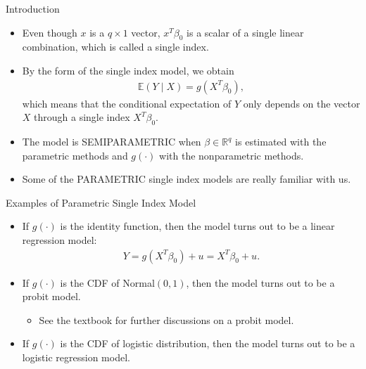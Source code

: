 \documentclass[xcolor=svgnames,dvipdfmx,cjk]{beamer}
\theoremstyle{example}
\begin{document}
\begin{frame}{Introduction}
  \begin{itemize}
    \item Even though $x$ is a $q\times1$ vector, 
          $x^{T} \beta_0$ is a scalar of a single linear combination, 
          which is called a single index.
    \item By the form of the single index model, we obtain
          \begin{align*}
            \mathbb{E}(Y \mid X) = g(X^{T} \beta_0),
          \end{align*}
          which means that 
          the conditional expectation of $Y$ 
          only depends on the vector $X$
          through a single index $X^{T} \beta_0$.
    \item The model is SEMIPARAMETRIC 
          when $\beta \in \mathbb{R}^{q}$ is estimated with the parametric methods
          and $g(\cdot)$ with the nonparametric methods.
    \item Some of the PARAMETRIC single index models are really familiar with us.
  \end{itemize}
\end{frame}

\begin{frame}{Examples of Parametric Single Index Model}
  \begin{itemize}
    \item If $g(\cdot)$ is the identity function, 
          then the model turns out to be a linear regression model:
          \begin{align*}
            Y = g (X^{T} \beta_0) + u = X^{T} \beta_0 + u.
          \end{align*}
    \item If $g(\cdot)$ is the CDF of Normal$(0, 1)$,
          then the model turns out to be a probit model.
          \begin{itemize}
            \item See the textbook for further discussions on a probit model.
          \end{itemize}
    \item If $g(\cdot)$ is the CDF of logistic distribution,
          then the model turns out to be a logistic regression model.
  \end{itemize}
  
\end{frame}


\begin{frame}                  
  \tableofcontents
\end{frame}
\end{document}
